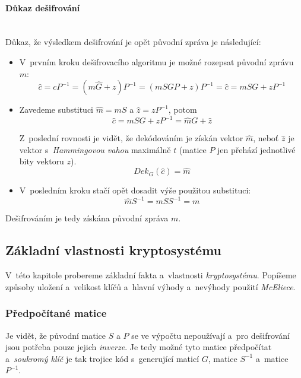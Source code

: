 \documentclass[thesis=M,czech,hidelinks]{FITthesis}[2012/06/26]
\newcommand{\0}{{\textcolor[gray]{0.75}{0}}}
\begin{document}
\paragraph{Důkaz dešifrování} \hfil \\
Důkaz, že výsledkem dešifrování je opět původní zpráva je následující:

\begin{itemize}
    \item V~prvním kroku dešifrovacího algoritmu je možné rozepsat původní
        zprávu~$m$:
        $$
            \hat{c} = c P^{-1} = \left( m \hat{G} + z \right) P^{-1} =
            \left(m S G P + z \right) P^{-1} = \hat{c} = m S G + z P^{-1}
        $$

    \item Zavedeme substituci $\hat{m} = m S$ a $\hat{z} = z P^{-1}$, potom
        $$ \hat{c} = m S G + z P^{-1} = \hat{m} G + \hat{z} $$

        Z~poslední rovnosti je vidět, že dekódováním je získán vektor $\hat{m}$,
        neboť $\hat{z}$ je vektor s~\emph{Hammingovou vahou} maximálně $t$
        (matice $P$ jen přehází jednotlivé bity vektoru $z$).
        $$ Dek_{G}\left(\hat{c}\right) = \hat{m} $$

    \item V~posledním kroku stačí opět dosadit výše použitou substituci:
        $$ \hat{m} S^{-1} = m S S^{-1} = m $$

\end{itemize}

Dešifrováním je tedy získána původní zpráva $m$.

\subsection{Základní vlastnosti kryptosystému}

V~této kapitole probereme základní fakta a~vlastnosti \emph{kryptosystému}.
Popíšeme způsoby uložení a~velikost klíčů a~hlavní výhody a~nevýhody použití
\emph{McEliece}.

\subsubsection{Předpočítané matice}

Je vidět, že původní matice $S$ a $P$ se ve výpočtu nepoužívají a~pro
dešifrování jsou potřeba pouze jejich \emph{inverze}. Je tedy možné tyto matice
předpočítat a~\emph{soukromý klíč} je tak trojice kód s~generující maticí $G$,
matice $S^{-1}$ a~matice~$P^{-1}$.
\end{document}

